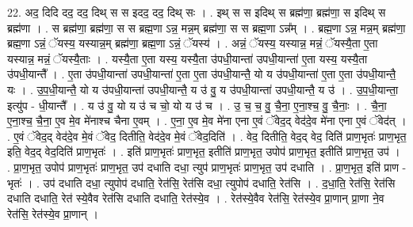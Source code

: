 \documentclass[17pt]{extarticle}
\begin{document}
22. अद॒ दिदि दद॒ दद॒ दिथ् स स इदद॒ दद॒ दिथ् सः । . इथ् स स इदिथ् स ब्रह्म॑णा॒ ब्रह्म॑णा॒ स इदिथ् स ब्रह्म॑णा । . स ब्रह्म॑णा॒ ब्रह्म॑णा॒ स स ब्रह्म॒णा ऽन्न॒ मन्न॒म् ब्रह्म॑णा॒ स स ब्रह्म॒णा ऽन्न᳚म् । . ब्रह्म॒णा ऽन्न॒ मन्न॒म् ब्रह्म॑णा॒ ब्रह्म॒णा ऽन्नं॒ ॅयस्य॒ यस्यान्न॒म् ब्रह्म॑णा॒ ब्रह्म॒णा ऽन्नं॒ ॅयस्य॑ । . अन्नं॒ ॅयस्य॒ यस्यान्न॒ मन्नं॒ ॅयस्यै॒ता ए॒ता यस्यान्न॒ मन्नं॒ ॅयस्यै॒ताः । . यस्यै॒ता ए॒ता यस्य॒ यस्यै॒ता उ॑पधी॒यान्ता॑ उपधी॒यान्ता॑ ए॒ता यस्य॒ यस्यै॒ता उ॑पधी॒यान्तै᳚ । . ए॒ता उ॑पधी॒यान्ता॑ उपधी॒यान्ता॑ ए॒ता ए॒ता उ॑पधी॒यान्तै॒ यो य उ॑पधी॒यान्ता॑ ए॒ता ए॒ता उ॑पधी॒यान्तै॒ यः । . उ॒प॒धी॒यान्तै॒ यो य उ॑पधी॒यान्ता॑ उपधी॒यान्तै॒ य उ॑ वु॒ य उ॑पधी॒यान्ता॑ उपधी॒यान्तै॒ य उ॑ । . उ॒प॒धी॒यान्ता॒ इत्यु॑प - धी॒यान्तै᳚ । . य उ॑ वु॒ यो य उ॑ च चो॒ यो य उ॑ च । . उ॒ च॒ च॒ वु॒ चै॒ना॒ ए॒ना॒श्च॒ वु॒ चै॒नाः॒ । . चै॒ना॒ ए॒ना॒श्च॒ चै॒ना॒ ए॒व मे॒व मे॑नाश्च चैना ए॒वम् । . ए॒ना॒ ए॒व मे॒व मे॑ना एना ए॒वं ॅवेद॒द् वेद॑दे॒व मे॑ना एना ए॒वं ॅवेद॑त् । . ए॒वं ॅवेद॒द् वेद॑दे॒व मे॒वं ॅवेद॒ दितीति॒ वेद॑दे॒व मे॒वं ॅवेद॒दिति॑ । . वेद॒ दितीति॒ वेद॒द् वेद॒ दिति॑ प्राण॒भृतः॑ प्राण॒भृत॒ इति॒ वेद॒द् वेद॒दिति॑ प्राण॒भृतः॑ । . इति॑ प्राण॒भृतः॑ प्राण॒भृत॒ इतीति॑ प्राण॒भृत॒ उपोप॑ प्राण॒भृत॒ इतीति॑ प्राण॒भृत॒ उप॑ । . प्रा॒ण॒भृत॒ उपोप॑ प्राण॒भृतः॑ प्राण॒भृत॒ उप॑ दधाति दधा॒ त्युप॑ प्राण॒भृतः॑ प्राण॒भृत॒ उप॑ दधाति । . प्रा॒ण॒भृत॒ इति॑ प्राण - भृतः॑ । . उप॑ दधाति दधा॒ त्युपोप॑ दधाति॒ रेत॑सि॒ रेत॑सि दधा॒ त्युपोप॑ दधाति॒ रेत॑सि । . द॒धा॒ति॒ रेत॑सि॒ रेत॑सि दधाति दधाति॒ रेत॑ स्ये॒वैव रेत॑सि दधाति दधाति॒ रेत॑स्ये॒व । . रेत॑स्ये॒वैव रेत॑सि॒ रेत॑स्ये॒व प्रा॒णान् प्रा॒णा ने॒व रेत॑सि॒ रेत॑स्ये॒व प्रा॒णान् । \newline
\end{document}
